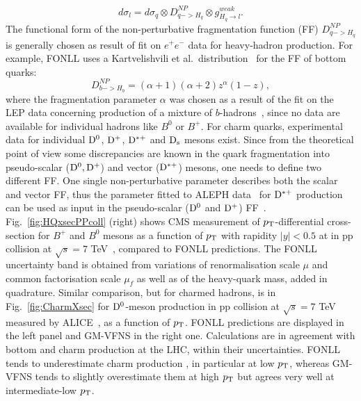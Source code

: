 \begin{equation}
d\sigma_l = d\sigma_{q} \otimes D^{NP}_{q->H_q} \otimes g^{weak}_{H_q \rightarrow l}.
\end{equation}
The functional form of the non-perturbative fragmentation function (FF) $D^{NP}_{q->H_q}$ 
is generally chosen as result of fit on $e^+e^-$ data for heavy-hadron production. For example, FONLL uses
a Kartvelishvili et al.~distribution~\cite{Kartvelishvili:1977pi} for the FF of bottom quarks:
\begin{equation}
D^{NP}_{b->H_b}= (\alpha +1 )(\alpha +2)z^{\alpha} (1-z),
\end{equation}
where the fragmentation parameter $\alpha$ was chosen as a result of the fit on the LEP data concerning production
of a mixture of $b$-hadrons~\cite{Cacciari:2005uk,Heister:2001jg,Abbiendi:2002vt}, since no data are available for individual hadrons like $B^0$ or $B^+$.
For charm quarks, experimental data for individual ${\rm D^0}$, ${\rm D^+}$, ${\rm D^{*+}}$ and ${\rm D_s}$ mesons exist.
Since from the theoretical point of view some discrepancies are known in the quark fragmentation into 
pseudo-scalar (${\rm D^0}, {\rm D^+}$) and vector (${\rm D^{*+}}$) mesons, one needs to define two different FF. One single non-perturbative parameter
describes both the scalar and vector FF, thus the parameter fitted to ALEPH data~\cite{Barate:1999bg} for ${\rm D^{*+}}$ production can
be used as input in the pseudo-scalar (${\rm D^0}$ and ${\rm D^+}$) FF~\cite{Cacciari:2003zu}.
Fig.~\ref{fig:HQxsecPPcoll} (right) shows CMS measurement of $p_{\rm T}$-differential cross-section for $B^+$ and $B^0$ mesons
as a function of $p_{\rm T}$ with rapidity $|y| < 0.5$ at in pp collision at $\sqrt{s} = 7$ TeV~\cite{Khachatryan:2011mk,Chatrchyan:2011pw}, compared to FONLL predictions.
The FONLL uncertainty band is obtained from variations of renormalisation scale $\mu$ and common factorisation
scale $\mu_f$ as well as of the heavy-quark mass, added in quadrature.
Similar comparison, but for charmed hadrons, is in Fig.~\ref{fig:CharmXsec} for ${\rm D^0}$-meson production
in pp collision at $\sqrt{s} = 7$ TeV measured by ALICE~\cite{Acharya:2017jgo}, as a function of $p_{\rm T}$. FONLL predictions are displayed in the left panel and GM-VFNS in the right one. 
Calculations are in agreement with bottom and charm production at the LHC, within their
uncertainties. FONLL tends to underestimate charm production , in particular at low $p_{\rm T}$, whereas GM-VFNS
tends to slightly overestimate them at high $p_{\rm T}$ but agrees very well at intermediate-low $p_{\rm T}$. \\



